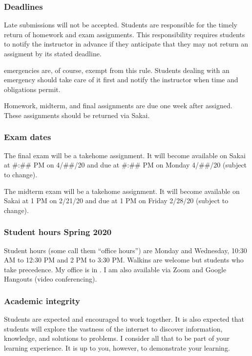 \documentclass[letterpaper,10pt,english]{sphinxmanual}
\begin{document}
\subsubsection{Deadlines}
\label{\detokenize{COMP180/organization:deadlines}}
Late submissions will not be accepted. Students are responsible for the timely return of homework and exam assignments. This responsibility requires students to notify the instructor in advance if they anticipate that they may not return an assigment by its stated deadline.

 emergencies are, of course, exempt from this rule. Students dealing with an emergency should take care of it first and notify the instructor when time and obligations permit.

Homework, midterm, and final assignments are due one week after assigned. These assignments should be returned via Sakai.


\subsubsection{Exam dates}
\label{\detokenize{COMP180/organization:exam-dates}}
The final exam will be a take\sphinxhyphen{}home assignment. It will become available on Sakai at \#:\#\# PM on 4/\#\#/20 and due at \#:\#\# PM on Monday 4/\#\#/20 (subject to change).

The midterm exam will be a take\sphinxhyphen{}home assignment. It will become available on Sakai at 1 PM on 2/21/20 and due at 1 PM on Friday 2/28/20 (subject to change).


\subsubsection{Student hours \sphinxhyphen{} Spring 2020}
\label{\detokenize{COMP180/organization:student-hours-spring-2020}}
Student hours (some call them “office hours”) are Monday and Wednesday, 10:30 AM to 12:30 PM and 2 PM to 3:30 PM. Walk\sphinxhyphen{}ins are welcome but students who   take precedence. My office is in . I am also available via Zoom and Google Hangouts (video conferencing).


\subsubsection{Academic integrity}
\label{\detokenize{COMP180/organization:academic-integrity}}
Students are expected and encouraged to work together. It is also expected that students will explore the vastness of the internet to discover information, knowledge, and solutions to problems. I consider all that to be part of your learning experience. It is up to you, however, to demonstrate your learning.
\end{document}
